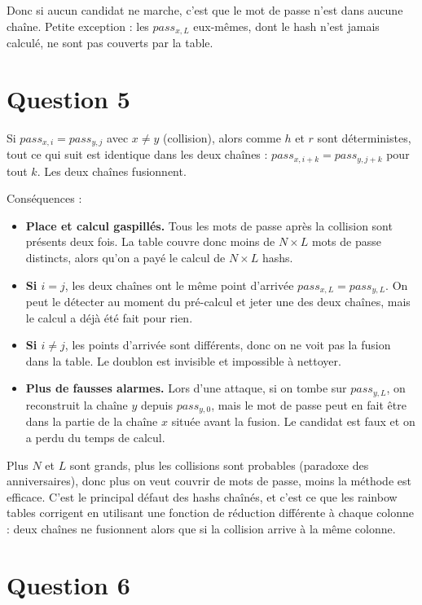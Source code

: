 \documentclass{article}
\begin{document}
Donc si aucun candidat ne marche, c'est que le mot de passe n'est dans aucune chaîne. Petite exception : les $pass_{x,L}$ eux-mêmes, dont le hash n'est jamais calculé, ne sont pas couverts par la table.

\section*{Question 5}

Si $pass_{x,i} = pass_{y,j}$ avec $x \neq y$ (collision), alors comme $h$ et $r$ sont déterministes, tout ce qui suit est identique dans les deux chaînes : $pass_{x,i+k} = pass_{y,j+k}$ pour tout $k$. Les deux chaînes fusionnent.

Conséquences :
\begin{itemize}
  \item \textbf{Place et calcul gaspillés.} Tous les mots de passe après la collision sont présents deux fois. La table couvre donc moins de $N \times L$ mots de passe distincts, alors qu'on a payé le calcul de $N \times L$ hashs.
  \item \textbf{Si $i = j$}, les deux chaînes ont le même point d'arrivée $pass_{x,L} = pass_{y,L}$. On peut le détecter au moment du pré-calcul et jeter une des deux chaînes, mais le calcul a déjà été fait pour rien.
  \item \textbf{Si $i \neq j$}, les points d'arrivée sont différents, donc on ne voit pas la fusion dans la table. Le doublon est invisible et impossible à nettoyer.
  \item \textbf{Plus de fausses alarmes.} Lors d'une attaque, si on tombe sur $pass_{y,L}$, on reconstruit la chaîne $y$ depuis $pass_{y,0}$, mais le mot de passe peut en fait être dans la partie de la chaîne $x$ située avant la fusion. Le candidat est faux et on a perdu du temps de calcul.
\end{itemize}

Plus $N$ et $L$ sont grands, plus les collisions sont probables (paradoxe des anniversaires), donc plus on veut couvrir de mots de passe, moins la méthode est efficace. C'est le principal défaut des hashs chaînés, et c'est ce que les rainbow tables corrigent en utilisant une fonction de réduction différente à chaque colonne : deux chaînes ne fusionnent alors que si la collision arrive à la même colonne.

\section*{Question 6}
\end{document}
